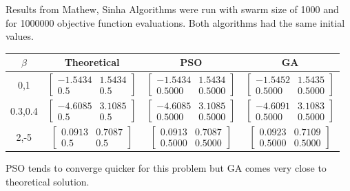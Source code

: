 \documentclass[11pt]{beamer}
\begin{document}
\begin{frame}{Results from Mathew, Sinha}
Algorithms were run with swarm size of 1000 and for 1000000 objective function evaluations. Both algorithms had the same initial values.
\begin{tabular}{|c|c|c|c|}
\hline 
$\beta$ & Theoretical & PSO & GA \\ 
\hline 
0,1 & $\begin{bmatrix}
-1.5434 & 1.5434\\ 0.5 & 0.5
\end{bmatrix}$ & $\begin{bmatrix}
-1.5434 & 1.5434\\ 0.5000 & 0.5000
\end{bmatrix}$ & $\begin{bmatrix}
-1.5452 & 1.5435\\ 0.5000 & 0.5000
\end{bmatrix}$ \\ 
\hline 
0.3,0.4 & $\begin{bmatrix}
-4.6085 & 3.1085\\ 0.5 & 0.5
\end{bmatrix}$ & $\begin{bmatrix}
-4.6085 & 3.1085\\ 0.5000 & 0.5000
\end{bmatrix}$ & $\begin{bmatrix}
-4.6091 & 3.1083\\ 0.5000 & 0.5000
\end{bmatrix}$ \\ 
\hline 
2,-5 & $\begin{bmatrix}
0.0913 & 0.7087\\ 0.5 & 0.5
\end{bmatrix}$ & $\begin{bmatrix}
0.0913 & 0.7087\\ 0.5000 & 0.5000
\end{bmatrix}$ & $\begin{bmatrix}
0.0923 & 0.7109\\ 0.5000 & 0.5000
\end{bmatrix}$  \\ 
\hline 
\end{tabular} 

PSO tends to converge quicker for this problem but GA comes very close to theoretical solution.
\end{frame}
\end{document}
